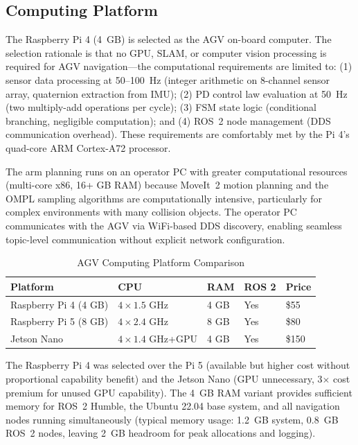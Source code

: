 \documentclass[12pt,a4paper,oneside]{report}
\begin{document}
\subsection{Computing Platform}

The Raspberry Pi 4 (4~GB) is selected as the AGV on-board computer. The selection rationale is that no GPU, SLAM, or computer vision processing is required for AGV navigation---the computational requirements are limited to: (1) sensor data processing at 50--100~Hz (integer arithmetic on 8-channel sensor array, quaternion extraction from IMU); (2) PD control law evaluation at 50~Hz (two multiply-add operations per cycle); (3) FSM state logic (conditional branching, negligible computation); and (4) ROS~2 node management (DDS communication overhead). These requirements are comfortably met by the Pi 4's quad-core ARM Cortex-A72 processor.

The arm planning runs on an operator PC with greater computational resources (multi-core x86, 16+ GB RAM) because MoveIt~2 motion planning and the OMPL sampling algorithms are computationally intensive, particularly for complex environments with many collision objects. The operator PC communicates with the AGV via WiFi-based DDS discovery, enabling seamless topic-level communication without explicit network configuration.

\begin{table}[H]
\centering
\caption{AGV Computing Platform Comparison}
\label{tab:compute}
\begin{tabular}{p{4cm} p{2.5cm} p{1.5cm} p{1.5cm} p{1.5cm}}
\toprule
\textbf{Platform} & \textbf{CPU} & \textbf{RAM} & \textbf{ROS 2} & \textbf{Price} \\
\midrule
Raspberry Pi 4 (4 GB) & $4\times 1.5$ GHz & 4 GB & Yes & \$55 \\
Raspberry Pi 5 (8 GB) & $4\times 2.4$ GHz & 8 GB & Yes & \$80 \\
Jetson Nano & $4\times 1.4$ GHz+GPU & 4 GB & Yes & \$150 \\
\bottomrule
\end{tabular}
\end{table}

The Raspberry Pi 4 was selected over the Pi 5 (available but higher cost without proportional capability benefit) and the Jetson Nano (GPU unnecessary, 3$\times$ cost premium for unused GPU capability). The 4~GB RAM variant provides sufficient memory for ROS~2 Humble, the Ubuntu 22.04 base system, and all navigation nodes running simultaneously (typical memory usage: 1.2~GB system, 0.8~GB ROS~2 nodes, leaving 2~GB headroom for peak allocations and logging).
\end{document}

